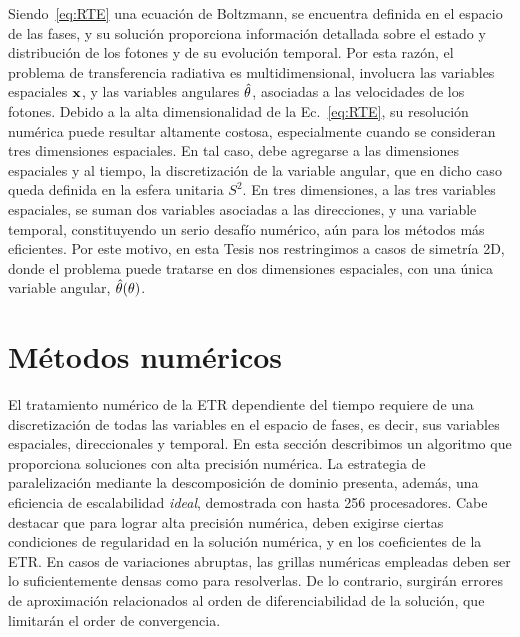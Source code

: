 Siendo~\eqref{eq:RTE} una ecuación de Boltzmann, 
se encuentra definida en el espacio de las fases, 
y su solución proporciona información detallada sobre el estado y distribución 
de los fotones y de su evolución temporal. Por esta razón, 
el problema de transferencia radiativa es multidimensional, 
involucra las variables espaciales $\mathbf{x}$, y las variables angulares 
$\hat{\theta}$, asociadas a las velocidades de los fotones. 
Debido a la alta dimensionalidad de la Ec.~\eqref{eq:RTE}, su resolución numérica 
puede resultar altamente costosa, especialmente cuando se consideran 
tres dimensiones espaciales. En tal caso, debe agregarse a las dimensiones 
espaciales y al tiempo, la discretización de la variable angular, 
que en dicho caso queda definida en la esfera unitaria $S^2$. 
En tres dimensiones, a las tres variables espaciales, se suman 
dos variables asociadas a las direcciones, y una variable temporal, 
constituyendo un serio desafío numérico,  
aún para los métodos más eficientes. 
Por este motivo, en esta Tesis nos restringimos a casos de 
simetría 2D, donde el 
problema puede tratarse en dos dimensiones espaciales, 
con una única variable angular, $\hat{\theta}(\theta)$.


\section{Métodos numéricos}
\label{sec:nummet}

El tratamiento numérico de la ETR dependiente del tiempo
requiere de una discretización de todas las variables en el espacio de fases,
 es decir, sus variables espaciales, direccionales y temporal. 
En esta sección describimos un algoritmo que proporciona 
soluciones con alta precisión numérica. La estrategia 
de paralelización mediante  
la descomposición de dominio presenta, además, una eficiencia 
de escalabilidad \textit{ideal}, demostrada con hasta 256 procesadores. 
Cabe destacar que para lograr alta precisión numérica, 
deben exigirse ciertas condiciones de regularidad 
en la solución numérica, y en los coeficientes 
de la ETR. En casos de variaciones abruptas, 
las grillas numéricas empleadas deben ser 
lo suficientemente densas como para resolverlas. 
 De lo contrario, surgirán errores de aproximación 
 relacionados al orden de diferenciabilidad de la solución,
 que limitarán el order de convergencia. 

